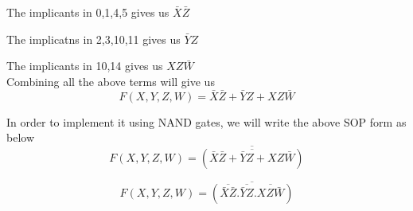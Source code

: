 \documentclass[12pt]{article}
\begin{document}
The implicants in 0,1,4,5 gives us $\bar{X}\bar{Z}$

The implicatns in 2,3,10,11 gives us $\bar{Y}Z$

The implicants in 10,14 gives us $XZ\bar{W}$ \\

Combining all the above terms will give us 
\begin{equation}
    F(X,Y,Z,W) = \bar{X}\bar{Z} + \bar{Y}Z + XZ\bar{W}
\end{equation}

In order to implement it using NAND gates, we will write the above SOP form as below
\begin{equation}
    F(X,Y,Z,W) = \overline{(\overline{\bar{X}\bar{Z} + \bar{Y}Z + XZ\bar{W}})}
\end{equation}

\begin{equation}
    F(X,Y,Z,W) = \overline{(\overline{\bar{X}\bar{Z}} . \overline{\bar{Y}Z} . \overline{XZ\bar{W}})}
\end{equation}
\end{document}
